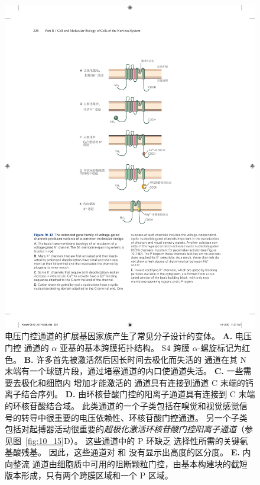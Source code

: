 \begin{figure}[htbp]
	\centering
	\includegraphics[width=0.65\linewidth]{chap10/fig_10_12}
	\caption{电压门控通道的扩展基因家族产生了常见分子设计的变体。
		\textbf{A.} 电压门控  通道的 $\alpha$ 亚基的基本跨膜拓扑结构。
		S4 跨膜 $\alpha$-螺旋标记为红色。
		\textbf{B.} 许多首先被激活然后因长时间去极化而失活的  通道在其 N 末端有一个球链片段，通过堵塞通道的内口使通道失活。
		\textbf{C.} 一些需要去极化和细胞内  增加才能激活的  通道具有连接到通道 C 末端的钙离子结合序列。
		\textbf{D.} 由环核苷酸门控的阳离子通道具有连接到 C 末端的环核苷酸结合域。
		此类通道的一个子类包括在嗅觉和视觉感觉信号的转导中很重要的电压依赖性、环核苷酸门控通道。
		另一个子类包括对起搏器活动很重要的\textit{超极化激活环核苷酸门控阳离子通道}（参见图~\ref{fig:10_15}D）。
		这些通道中的 P 环缺乏  选择性所需的关键氨基酸残基。
		因此，这些通道对  和  没有显示出高度的区分度。
		\textbf{E.} 内向整流  通道由细胞质中可用的阻断颗粒门控，由基本构建块的截短版本形成，只有两个跨膜区域和一个 P 区域。}
	\label{fig:10_12}
\end{figure}


